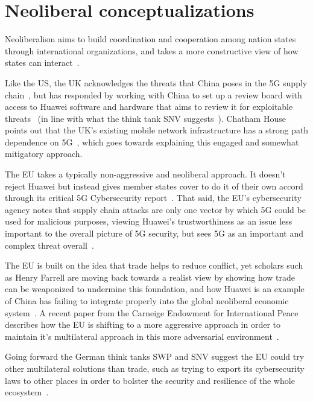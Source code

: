 \section{Neoliberal conceptualizations}
Neoliberalism aims to build coordination and cooperation among nation states
through international organizations, and takes a more constructive view of how
states can interact~\cite{keohane1986neorealism}.

Like the US, the UK acknowledges the threats that China poses in the 5G supply
chain~\cite{uk2019telecoms}, but has responded by working with China to set up a
review board with access to Huawei software and hardware that aims to review it
for exploitable threats~\cite{uk2019huaweiboard} (in line with what the think
tank SNV suggests~\cite{kleinhans20195g}). Chatham House points out that the
UK's existing mobile network infrastructure has a strong path dependence on
5G~\cite{chatham2019whosafraid}, which goes towards explaining this engaged and
somewhat mitigatory approach.

The EU takes a typically non-aggressive and neoliberal approach. It doesn't
reject Huawei but instead gives member states cover to do it of their own accord
through its critical 5G Cybersecurity report~\cite{eu2019cybersecurity}. That
said, the EU's cybersecurity agency notes that supply chain attacks are only one
vector by which 5G could be used for malicious purposes, viewing Huawei's
trustworthiness as an issue less important to the overall picture of 5G
security, but sees 5G as an important and complex threat
overall~\cite{enisa20195gnetworks}.

The EU is built on the idea that trade helps to reduce conflict, yet scholars
such as Henry Farrell are moving back towards a realist view by showing
how trade can be weaponized to undermine this foundation, and how Huawei is an
example of China has failing to integrate properly into the global neoliberal
economic system~\cite{farrell2019weaponized}. A recent paper from the Carneige
Endowment for International Peace describes how the EU is shifting to a more
aggressive approach in order to maintain it's multilateral approach in this more
adversarial environment~\cite{brattberg2020eu}.

Going forward the German think tanks SWP and SNV suggest the EU could try other
multilateral solutions than trade, such as trying to export its cybersecurity
laws to other places in order to bolster the security and resilience of the
whole ecosystem~\cite{bendiek2019europe, saslow2019globalcyber}.

